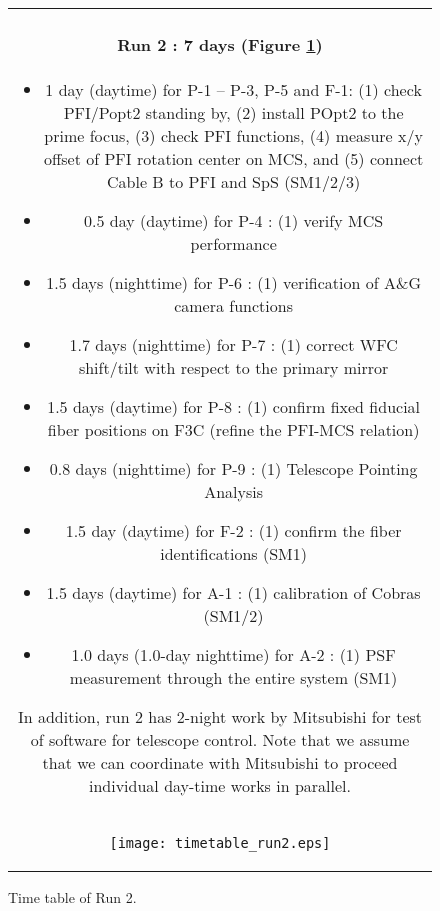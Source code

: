 \begin{figure}[!ht]
\begin{center}
\begin{tabular}{c}
\begin{minipage}{0.95\hsize}
\paragraph{Run 2 : 7 days  (Figure \ref{fig:run2})}
	\begin{itemize}
	\item 1 day (daytime) for P-1 -- P-3, P-5  and F-1:
	(1) check PFI/Popt2 standing by,
	(2) install POpt2 to the prime focus,
	(3) check PFI functions,
	(4) measure x/y offset of PFI rotation center on MCS, and
	(5) connect Cable B to PFI and SpS (SM1/2/3)
	\item 0.5 day (daytime) for P-4 :
	(1) verify  MCS performance
	\item 1.5 days (nighttime) for P-6 :
	(1) verification of A\&G camera functions 
	\item 1.7 days (nighttime) for P-7 :
	(1) correct WFC shift/tilt with respect to the primary mirror
	\item 1.5 days (daytime) for P-8 :  
	(1) confirm fixed fiducial fiber positions on F3C (refine the PFI-MCS relation)
	\item 0.8 days (nighttime) for P-9 :
	(1) Telescope Pointing Analysis
	\item 1.5 day (daytime) for F-2 :  
	(1) confirm  the fiber identifications (SM1)
	\item 1.5 days (daytime) for A-1 : 
	(1) calibration of Cobras (SM1/2)
	\item 1.0 days (1.0-day nighttime) for A-2 : 
	(1) PSF measurement through the entire system (SM1)	
\end{itemize}
In addition, run 2 has 2-night work by Mitsubishi for test of software for telescope control.
Note that we assume that we can coordinate with Mitsubishi to proceed individual day-time works in parallel.
\end{minipage} \\
\begin{minipage}{0.8\hsize}
	\begin{center}
	\vspace*{5mm}
	\texttt{[image: timetable\_run2.eps]}
	\end{center}
	\vspace*{-5mm}
	\caption{Time table of Run 2.}
	\label{fig:run2}
\end{minipage}
\end{tabular}
\end{center}
\end{figure}

